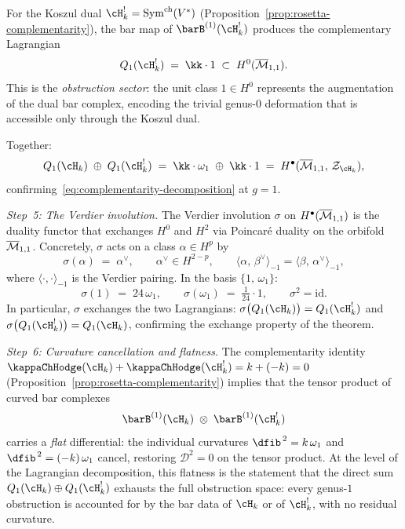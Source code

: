\begin{computation}
For the Koszul dual $\cH_k^! = \mathrm{Sym}^{\mathrm{ch}}(V^*)$
(Proposition~\ref{prop:rosetta-complementarity}), the bar
map of $\barB^{(1)}(\cH_k^!)$ produces the complementary
Lagrangian
\begin{equation}\label{eq:complementarity-Q1-Hkdual}
Q_1(\cH_k^!)
\;=\;
\kk \cdot 1
\;\subset\;
H^0(\Mbar_{1,1}).
\end{equation}
This is the \emph{obstruction sector}: the unit class
$1 \in H^0$ represents the augmentation of the dual bar
complex, encoding the trivial genus-$0$ deformation that
is accessible only through the Koszul dual.

Together:
\begin{equation}\label{eq:complementarity-heisenberg-sum}
Q_1(\cH_k) \;\oplus\; Q_1(\cH_k^!)
\;=\;
\kk\cdot\omega_1 \;\oplus\; \kk\cdot 1
\;=\;
H^\bullet(\Mbar_{1,1},\,\cZ_{\cH_k}),
\end{equation}
confirming~\eqref{eq:complementarity-decomposition} at $g = 1$.

\medskip
\noindent
\textit{Step~5: The Verdier involution.}\enspace
The Verdier involution $\sigma$ on $H^\bullet(\overline{\mathcal{M}}_{1,1})$
is the duality functor that exchanges $H^0$ and $H^2$ via
Poincar\'e duality on the orbifold $\overline{\mathcal{M}}_{1,1}$. Concretely,
$\sigma$ acts on a class $\alpha \in H^p$ by
\[
\sigma(\alpha) \;=\; \alpha^\vee,
\qquad
\alpha^\vee \in H^{2-p},
\qquad
\langle \alpha,\, \beta^\vee\rangle_{-1}
= \langle \beta,\, \alpha^\vee\rangle_{-1},
\]
where $\langle\cdot,\cdot\rangle_{-1}$ is the Verdier pairing.
In the basis $\{1,\, \omega_1\}$:
\[
\sigma(1) \;=\; 24\,\omega_1,
\qquad
\sigma(\omega_1) \;=\; \tfrac{1}{24}\cdot 1,
\qquad
\sigma^2 = \mathrm{id}.
\]
In particular, $\sigma$ exchanges the two Lagrangians:
$\sigma\bigl(Q_1(\cH_k)\bigr) = Q_1(\cH_k^!)$ and
$\sigma\bigl(Q_1(\cH_k^!)\bigr) = Q_1(\cH_k)$, confirming
the exchange property of the theorem.

\medskip
\noindent
\textit{Step~6: Curvature cancellation and flatness.}\enspace
The complementarity identity
$\kappaChHodge(\cH_k) + \kappaChHodge(\cH_k^!) = k + (-k) = 0$
(Proposition~\ref{prop:rosetta-complementarity})
implies that the tensor product of curved bar complexes
\[
\barB^{(1)}(\cH_k) \;\otimes\; \barB^{(1)}(\cH_k^!)
\]
carries a \emph{flat} differential: the individual curvatures
$\dfib^{\,2} = k\,\omega_1$ and
$\dfib^{\,2} = (-k)\,\omega_1$ cancel, restoring
$\mathcal{D}^2 = 0$ on the tensor product.
At the level of the Lagrangian decomposition, this flatness
is the statement that the direct sum
$Q_1(\cH_k) \oplus Q_1(\cH_k^!)$ exhausts the full
obstruction space: every genus-$1$ obstruction is accounted for
by the bar data of $\cH_k$ or of $\cH_k^!$, with no residual
curvature.


\end{computation}
